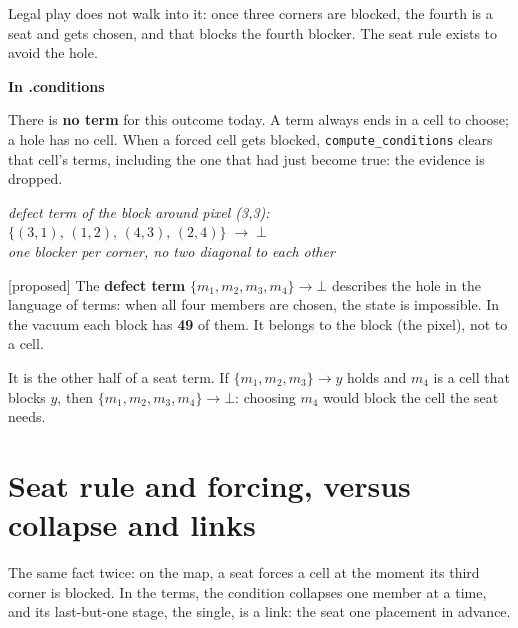 \documentclass[10pt,a4paper]{article}
\newcommand{\proposed}{\textsf{\scriptsize\color{candc}[proposed]}}
\newcommand{\interms}{\par\medskip\textsf{\small\bfseries\color{inksoft}In .conditions}\par}
\newcommand{\code}[1]{\texttt{#1}}
\newcommand{\T}[1]{\ensuremath{\{#1\}}}
\newenvironment{algebra}{\begin{center}\begin{minipage}{0.92\linewidth}\small\setlength{\parskip}{0.2em}}{\end{minipage}\end{center}}
\newcommand{\cmt}[1]{{\color{inksoft}\textit{#1}}}
\begin{document}
Legal play does not walk into it: once three corners are blocked, the fourth is a seat and gets chosen, and that blocks the fourth blocker. The seat rule exists to avoid the hole.

\interms
There is \textbf{no term} for this outcome today. A term always ends in a cell to choose; a hole has no cell. When a forced cell gets blocked, \code{compute\_conditions} clears that cell's terms, including the one that had just become true: the evidence is dropped.
\begin{algebra}
\cmt{defect term of the block around pixel (3,3):}\\
$\T{(3,1),\,(1,2),\,(4,3),\,(2,4)} \;\longrightarrow\; \bot$\\
\cmt{one blocker per corner, no two diagonal to each other}
\end{algebra}
\proposed{} The \textbf{defect term} $\T{m_1,m_2,m_3,m_4}\to\bot$ describes the hole in the language of terms: when all four members are chosen, the state is impossible. In the vacuum each block has \textbf{49} of them. It belongs to the block (the pixel), not to a cell.

It is the other half of a seat term. If $\T{m_1,m_2,m_3}\to y$ holds and $m_4$ is a cell that blocks $y$, then $\T{m_1,m_2,m_3,m_4}\to\bot$: choosing $m_4$ would block the cell the seat needs.

\section{Seat rule and forcing, versus collapse and links}

The same fact twice: on the map, a seat forces a cell at the moment its third corner is blocked. In the terms, the condition collapses one member at a time, and its last-but-one stage, the single, is a link: the seat one placement in advance.
\end{document}
